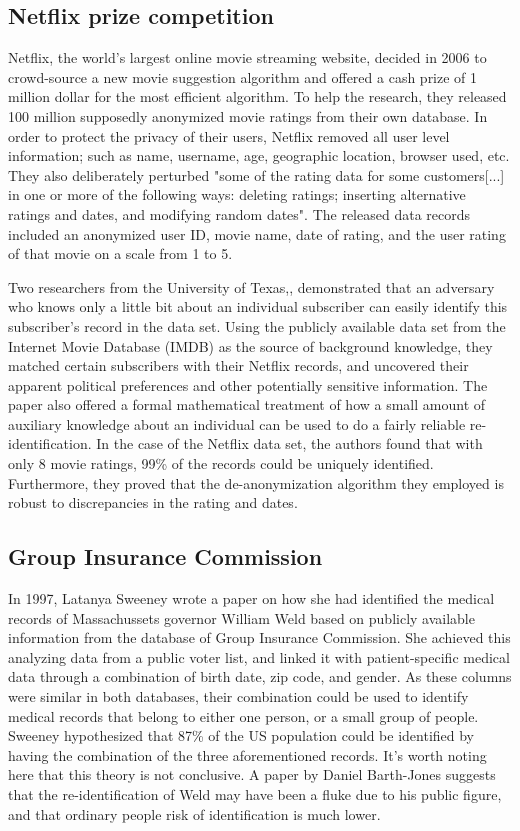 \subsection{Netflix prize competition}
Netflix, the world's largest online movie streaming website, decided in 2006 to crowd-source a new movie suggestion algorithm and offered a cash prize of 1 million dollar for the most efficient algorithm. To help the research, they released 100 million supposedly anonymized movie ratings from their own database. In order to protect the privacy of their users, Netflix removed all user level information; such as name, username, age, geographic location, browser used, etc. They also deliberately perturbed "some of the rating data for some customers[...] in one or more of the following ways: deleting ratings; inserting alternative ratings and dates, and modifying random dates"\citep{bell2007netflix}. The released data records included an anonymized user ID, movie name, date of rating, and the user rating of that movie on a scale from 1 to 5. 

Two researchers from the University of Texas,\cite{narayanan2008robust}, demonstrated that an adversary who knows only a little bit about an individual subscriber can easily identify this subscriber's record in the data set. Using the publicly available data set from the Internet Movie Database (IMDB) as the source of background knowledge, they matched certain subscribers with their Netflix records, and uncovered their apparent political preferences and other potentially sensitive information. The paper also offered a formal mathematical treatment of how a small amount of auxiliary knowledge about an individual can be used to do a fairly reliable re-identification. In the case of the Netflix data set, the authors \citep{narayanan2008robust} found that with only 8 movie ratings, 99\% of the records could be uniquely identified. Furthermore, they proved that the de-anonymization algorithm they employed is robust to discrepancies in the rating and dates.

\subsection{Group Insurance Commission} \label{sec:GIC}
In 1997, Latanya Sweeney wrote a paper on how she had identified the medical records of Massachussets governor William Weld based on publicly available information from the database of Group Insurance Commission. She achieved this analyzing data from a public voter list, and linked it with patient-specific medical data through a combination of birth date, zip code, and gender\citep{sweeney2002k}. As these columns were similar in both databases, their combination could be used to identify medical records that belong to either one person, or a small group of people. Sweeney hypothesized that 87\% of the US population could be identified by having the combination of the three aforementioned records. It's worth noting here that this theory is not conclusive. A paper by Daniel Barth-Jones suggests that the re-identification of Weld may have been a fluke due to his public figure, and that ordinary people risk of identification is much lower\citep{barth2012re}. 

